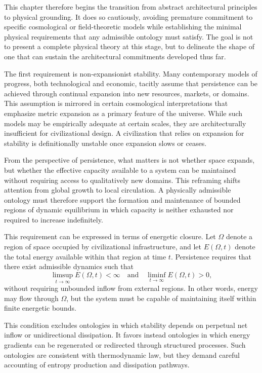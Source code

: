 \documentclass[12pt,oneside]{book}
\begin{document}
This chapter therefore begins the transition from abstract architectural principles to physical grounding. It does so cautiously, avoiding premature commitment to specific cosmological or field-theoretic models while establishing the minimal physical requirements that any admissible ontology must satisfy. The goal is not to present a complete physical theory at this stage, but to delineate the shape of one that can sustain the architectural commitments developed thus far.

The first requirement is non-expansionist stability. Many contemporary models of progress, both technological and economic, tacitly assume that persistence can be achieved through continual expansion into new resources, markets, or domains. This assumption is mirrored in certain cosmological interpretations that emphasize metric expansion as a primary feature of the universe. While such models may be empirically adequate at certain scales, they are architecturally insufficient for civilizational design. A civilization that relies on expansion for stability is definitionally unstable once expansion slows or ceases.

From the perspective of persistence, what matters is not whether space expands, but whether the effective capacity available to a system can be maintained without requiring access to qualitatively new domains. This reframing shifts attention from global growth to local circulation. A physically admissible ontology must therefore support the formation and maintenance of bounded regions of dynamic equilibrium in which capacity is neither exhausted nor required to increase indefinitely.

This requirement can be expressed in terms of energetic closure. Let \(\Omega\) denote a region of space occupied by civilizational infrastructure, and let \(E(\Omega,t)\) denote the total energy available within that region at time \(t\). Persistence requires that there exist admissible dynamics such that
\[
\limsup_{t \to \infty} E(\Omega,t) < \infty
\quad \text{and} \quad
\liminf_{t \to \infty} E(\Omega,t) > 0,
\]
without requiring unbounded inflow from external regions. In other words, energy may flow through \(\Omega\), but the system must be capable of maintaining itself within finite energetic bounds.

This condition excludes ontologies in which stability depends on perpetual net inflow or unidirectional dissipation. It favors instead ontologies in which energy gradients can be regenerated or redirected through structured processes. Such ontologies are consistent with thermodynamic law, but they demand careful accounting of entropy production and dissipation pathways.
\end{document}
